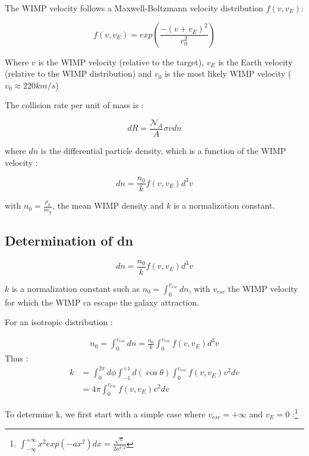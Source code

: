 \documentclass[a4paper, twoside, openany, 11pt]{book}
\begin{document}
The WIMP velocity follows a Maxwell-Boltzmann velocity distribution $f(v,v_E)$:

\begin{equation}
\label{eq:f(v)}
f(v,v_E) = exp(\frac{-(v+v_E)^2}{v_0 ^2})
\end{equation}

Where $v$ is the WIMP velocity (relative to the target), $v_E$ is the Earth velocity (relative to the WIMP distribution) and $v_0$ is the most likely WIMP velocity ($v_0 \approx 220 km/s$)


The collision rate per unit of mass  is : 

\begin{equation}
\label{eq:diffrate1}
dR= \frac{\mathcal{N}_A}{A}\sigma v dn 
\end{equation}

where $dn$ is the differential particle density, which is  a function of the WIMP velocity : 

\begin{equation}
\label{eq:dn}
dn = \frac{n_0}{k} f(v,v_E)d^3v
\end{equation}

with $n_0 = \frac{\rho_0}{m_\chi}$, the mean WIMP density and $k$ is a normalization constant. 


\subsection{Determination of dn}

\begin{equation*}
dn = \frac{n_0}{k} f(v,v_E)d^3v
\end{equation*}

$k$ is a normalization constant such as $n_0= \int_0^{v_{esc}} dn$, with $v_{esc}$ the WIMP velocity for which the WIMP ca escape the galaxy attraction.

For an isotropic distribution :

\begin{align*}
n_0 = \int_0^{v_{esc}} dn = \frac{n_0}{k} \int_0^{v_{esc}}  f(v,v_E)d^3v 
\end{align*}
Thus :
\begin{align*}
k&= \int_0^{2\pi} d\phi \int_{-1}^{+1} d(\cos \theta) \int_0^{v_{esc}} f(v,v_E) v^2 dv  \\
&=4\pi \int_0^{v_{esc}} f(v,v_E) v^2 dv 
\end{align*}

To determine k, we first start with a simple case where $v_{esc} = +\infty$ and $v_E = 0$ :\footnote{$\int_{-\infty}^{+\infty} x^2 exp(-ax^2)dx = \frac{\sqrt{\pi}}{2a^{3/2}}$}
\end{document}
